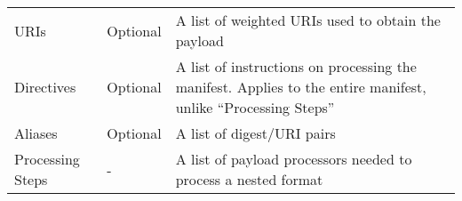 \begin{longtable}[]{@{}lll@{}}
\begin{minipage}[t]{0.23\columnwidth}
URIs\strut
\end{minipage} & \begin{minipage}[t]{0.26\columnwidth}\raggedright\strut
Optional\strut
\end{minipage} & \begin{minipage}[t]{0.42\columnwidth}\raggedright\strut
A list of weighted URIs used to obtain the payload\strut
\end{minipage}\tabularnewline
\begin{minipage}[t]{0.23\columnwidth}\raggedright\strut
Directives\strut
\end{minipage} & \begin{minipage}[t]{0.26\columnwidth}\raggedright\strut
Optional\strut
\end{minipage} & \begin{minipage}[t]{0.42\columnwidth}\raggedright\strut
A list of instructions on processing the manifest. Applies to the entire
manifest, unlike ``Processing Steps''\strut
\end{minipage}\tabularnewline
\begin{minipage}[t]{0.23\columnwidth}\raggedright\strut
Aliases\strut
\end{minipage} & \begin{minipage}[t]{0.26\columnwidth}\raggedright\strut
Optional\strut
\end{minipage} & \begin{minipage}[t]{0.42\columnwidth}\raggedright\strut
A list of digest/URI pairs\strut
\end{minipage}\tabularnewline
\begin{minipage}[t]{0.23\columnwidth}\raggedright\strut
Processing Steps\strut
\end{minipage} & \begin{minipage}[t]{0.26\columnwidth}\raggedright\strut
-\strut
\end{minipage} & \begin{minipage}[t]{0.42\columnwidth}\raggedright\strut
A list of payload processors needed to process a nested format\strut
\end{minipage}\tabularnewline
\bottomrule
\end{longtable}

